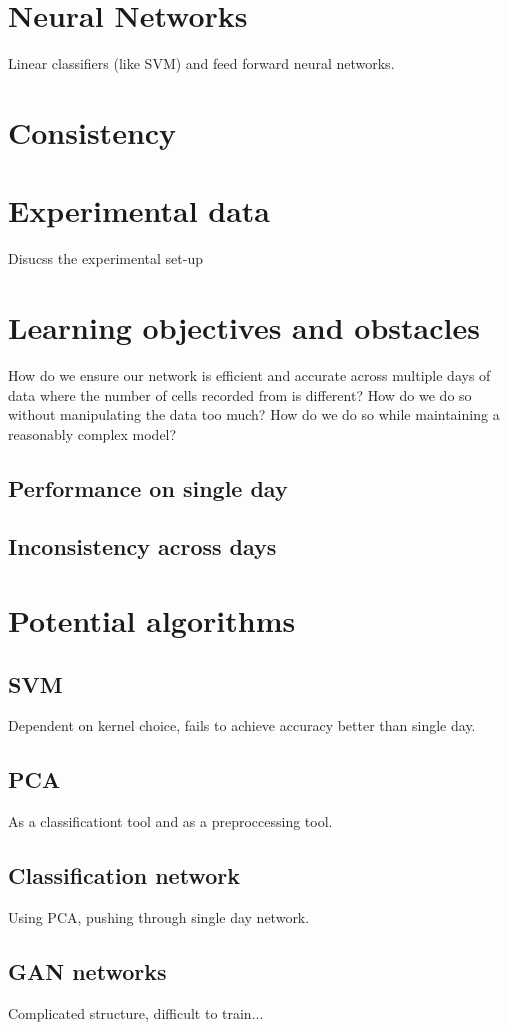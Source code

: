 \documentclass[12pt]{article}
\begin{document}
\section{Neural Networks}
Linear classifiers (like SVM) and feed forward neural networks.
\section*{Consistency}
\section{Experimental data}
Disucss the experimental set-up
\section{Learning objectives and obstacles}
How do we ensure our network is efficient and accurate across multiple days of data where the number of cells recorded from is different? How do we do so without manipulating the data too much? How do we do so while maintaining a reasonably complex model?
\subsection{Performance on single day}
\subsection{Inconsistency across days}
\section{Potential algorithms}
\subsection{SVM}
Dependent on kernel choice, fails to achieve accuracy better than single day.
\subsection{PCA}
As a classificationt tool and as a preproccessing tool.
\subsection{Classification network}
Using PCA, pushing through single day network.
\subsection{GAN networks}
Complicated structure, difficult to train...
\end{document}
